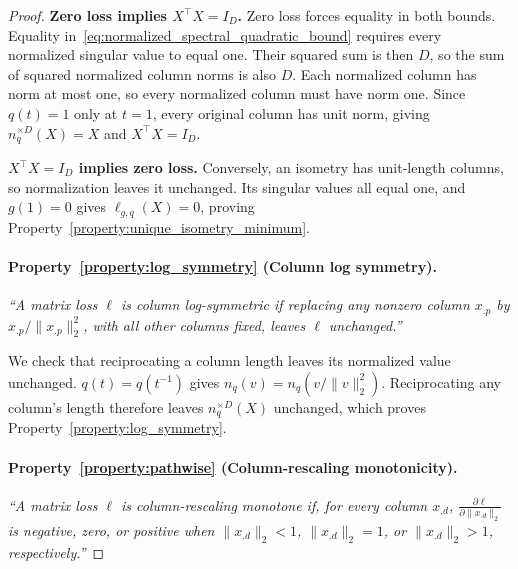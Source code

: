 \begin{proof}
\textbf{Zero loss implies $X^\top X=I_D$.}
Zero loss forces equality in both bounds.
Equality in~\eqref{eq:normalized_spectral_quadratic_bound} requires every normalized singular value to equal one.
Their squared sum is then $D$, so the sum of squared normalized column norms is also $D$.
Each normalized column has norm at most one, so every normalized column must have norm one.
Since $q(t)=1$ only at $t=1$, every original column has unit norm, giving $n_q^{\times D}(X)=X$ and $X^\top X=I_D$.

\textbf{$X^\top X=I_D$ implies zero loss.}
Conversely, an isometry has unit-length columns, so normalization leaves it unchanged.
Its singular values all equal one, and $g(1)=0$ gives $\ell_{g,q}(X)=0$, proving Property~\ref{property:unique_isometry_minimum}.

\paragraph{Property~\ref{property:log_symmetry} (Column log symmetry).}
\emph{``A matrix loss $\ell$ is column log-symmetric if replacing any nonzero column $x_{.p}$ by $x_{.p}/\|x_{.p}\|_2^2$, with all other columns fixed, leaves $\ell$ unchanged.''}

We check that reciprocating a column length leaves its normalized value unchanged.
$q(t)=q(t^{-1})$ gives $n_q(v)=n_q(v/\|v\|_2^2)$.
Reciprocating any column's length therefore leaves $n_q^{\times D}(X)$ unchanged, which proves Property~\ref{property:log_symmetry}.


\paragraph{Property~\ref{property:pathwise} (Column-rescaling monotonicity).}
\emph{``A matrix loss $\ell$ is column-rescaling monotone if, for every column $x_{.d}$, $\frac{\partial\ell}{\partial\|x_{.d}\|_2}$ is negative, zero, or positive when $\|x_{.d}\|_2<1$, $\|x_{.d}\|_2=1$, or $\|x_{.d}\|_2>1$, respectively.''}


\end{proof}
